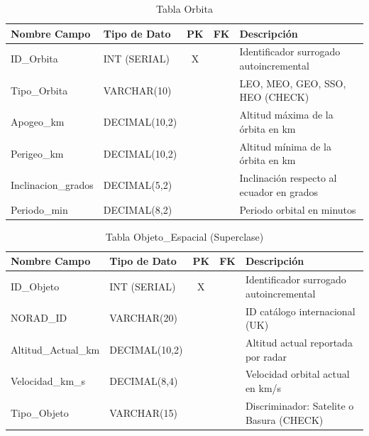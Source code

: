 \begin{table}[H]
\centering
\footnotesize
\begin{tabular}{|l|l|c|c|p{5cm}|}
\hline
\textbf{Nombre Campo} & \textbf{Tipo de Dato} & \textbf{PK} & \textbf{FK} & \textbf{Descripción} \\
\hline
ID\_Orbita & INT (SERIAL) & X & & Identificador surrogado autoincremental \\
\hline
Tipo\_Orbita & VARCHAR(10) & & & LEO, MEO, GEO, SSO, HEO (CHECK) \\
\hline
Apogeo\_km & DECIMAL(10,2) & & & Altitud máxima de la órbita en km \\
\hline
Perigeo\_km & DECIMAL(10,2) & & & Altitud mínima de la órbita en km \\
\hline
Inclinacion\_grados & DECIMAL(5,2) & & & Inclinación respecto al ecuador en grados \\
\hline
Periodo\_min & DECIMAL(8,2) & & & Periodo orbital en minutos \\
\hline
\end{tabular}
\caption{Tabla Orbita}
\end{table}

\begin{table}[H]
\centering
\footnotesize
\begin{tabular}{|l|l|c|c|p{5cm}|}
\hline
\textbf{Nombre Campo} & \textbf{Tipo de Dato} & \textbf{PK} & \textbf{FK} & \textbf{Descripción} \\
\hline
ID\_Objeto & INT (SERIAL) & X & & Identificador surrogado autoincremental \\
\hline
NORAD\_ID & VARCHAR(20) & & & ID catálogo internacional (UK) \\
\hline
Altitud\_Actual\_km & DECIMAL(10,2) & & & Altitud actual reportada por radar \\
\hline
Velocidad\_km\_s & DECIMAL(8,4) & & & Velocidad orbital actual en km/s \\
\hline
Tipo\_Objeto & VARCHAR(15) & & & Discriminador: Satelite o Basura (CHECK) \\
\hline
\end{tabular}
\caption{Tabla Objeto\_Espacial (Superclase)}
\end{table}

